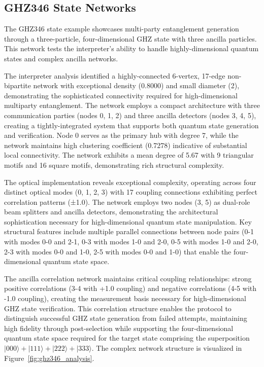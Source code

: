 \documentclass[11pt,a4paper]{article}
\begin{document}
\subsection{GHZ346 State Networks}

The GHZ346 state example showcases multi-party entanglement generation through a three-particle, four-dimensional GHZ state with three ancilla particles. This network tests the interpreter's ability to handle highly-dimensional quantum states and complex ancilla networks.

The interpreter analysis identified a highly-connected 6-vertex, 17-edge non-bipartite network with exceptional density (0.8000) and small diameter (2), demonstrating the sophisticated connectivity required for high-dimensional multiparty entanglement. The network employs a compact architecture with three communication parties (nodes 0, 1, 2) and three ancilla detectors (nodes 3, 4, 5), creating a tightly-integrated system that supports both quantum state generation and verification. Node 0 serves as the primary hub with degree 7, while the network maintains high clustering coefficient (0.7278) indicative of substantial local connectivity. The network exhibits a mean degree of 5.67 with 9 triangular motifs and 16 square motifs, demonstrating rich structural complexity.

The optical implementation reveals exceptional complexity, operating across four distinct optical modes (0, 1, 2, 3) with 17 coupling connections exhibiting perfect correlation patterns (±1.0). The network employs two nodes (3, 5) as dual-role beam splitters and ancilla detectors, demonstrating the architectural sophistication necessary for high-dimensional quantum state manipulation. Key structural features include multiple parallel connections between node pairs (0-1 with modes 0-0 and 2-1, 0-3 with modes 1-0 and 2-0, 0-5 with modes 1-0 and 2-0, 2-3 with modes 0-0 and 1-0, 2-5 with modes 0-0 and 1-0) that enable the four-dimensional quantum state space.

The ancilla correlation network maintains critical coupling relationships: strong positive correlations (3-4 with +1.0 coupling) and negative correlations (4-5 with -1.0 coupling), creating the measurement basis necessary for high-dimensional GHZ state verification. This correlation structure enables the protocol to distinguish successful GHZ state generation from failed attempts, maintaining high fidelity through post-selection while supporting the four-dimensional quantum state space required for the target state comprising the superposition $|000\rangle + |111\rangle + |222\rangle + |333\rangle$. The complex network structure is visualized in Figure~\ref{fig:ghz346_analysis}.
\end{document}
